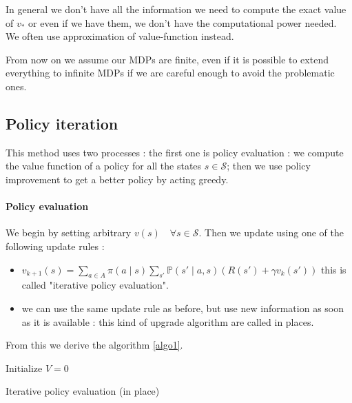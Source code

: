 \documentclass[14pt,a4paper]{article}
\theoremstyle{definition}
\begin{document}
In general we don't have all the information we need to compute the exact value of $v_{*}$ or even if we have them, we don't have the computational 
power needed. We often use approximation of value-function instead.


From now on we assume our MDPs are finite, even if it is possible to extend everything to infinite MDPs if we are careful enough to avoid the problematic ones. \citep{Sutton}

\subsection{Policy iteration}

This method uses two processes : the first one is policy evaluation : we compute the value function of a policy for all the states $s \in \mathcal{S} $; then we use policy improvement to get a better policy by acting greedy.
\paragraph{Policy evaluation} 


We begin by setting arbitrary $v(s) \quad \forall s \in \mathcal{S}$.
Then we update using one of the following update rules : 

\begin{itemize}
\item $v_{k+1}(s)=\underset{a \in A}{\sum}\pi(a \mid s)\underset{s'}{\sum}\mathbb{P}(s'\mid a,s)(R(s')+\gamma v_k(s'))$ \quad this is called "iterative policy evaluation".
\item we can use the same update rule as before, but use new information as soon as it is available : this kind of upgrade algorithm are called in places.
\end{itemize}

From this we derive the algorithm \ref{algo1}.


\begin{algorithm}
\label{algo1}

    Initialize $V = 0$\\
    
    \caption{Iterative policy evaluation (in place)}
\end{algorithm}
\end{document}

